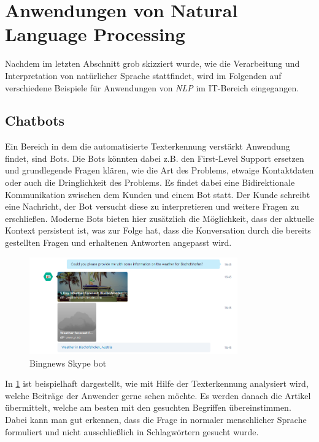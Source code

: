 \section{Anwendungen von Natural Language Processing}
Nachdem im letzten Abschnitt grob skizziert wurde, wie die Verarbeitung und Interpretation von natürlicher Sprache stattfindet, wird im Folgenden auf verschiedene Beispiele für Anwendungen von \textit{NLP} im IT-Bereich eingegangen.

\subsection{Chatbots}
Ein Bereich in dem die automatisierte Texterkennung verstärkt Anwendung findet, sind Bots. Die Bots könnten dabei z.B. den First-Level Support ersetzen und grundlegende Fragen klären, wie die Art des Problems, etwaige Kontaktdaten oder auch die Dringlichkeit des Problems. Es findet dabei eine Bidirektionale Kommunikation zwischen dem Kunden und einem Bot statt. Der Kunde schreibt eine Nachricht, der Bot versucht diese zu interpretieren und weitere Fragen zu erschließen. Moderne Bots bieten hier zusätzlich die Möglichkeit, dass der aktuelle Kontext persistent ist, was zur Folge hat, dass die Konversation durch die bereits gestellten Fragen und erhaltenen Antworten angepasst wird. 

\begin{figure}[ht]
	\centering
		\includegraphics[width=0.80\textwidth]{images/chatbot.PNG}
	\caption{Bingnews Skype bot}
	\label{fig:chatbot}
\end{figure}

In \ref{fig:chatbot} ist beispielhaft dargestellt, wie mit Hilfe der Texterkennung analysiert wird, welche Beiträge der Anwender gerne sehen möchte. Es werden danach die Artikel übermittelt, welche am besten mit den gesuchten Begriffen übereinstimmen. Dabei kann man gut erkennen, dass die Frage in normaler menschlicher Sprache formuliert und nicht ausschließlich in Schlagwörtern gesucht wurde. 

